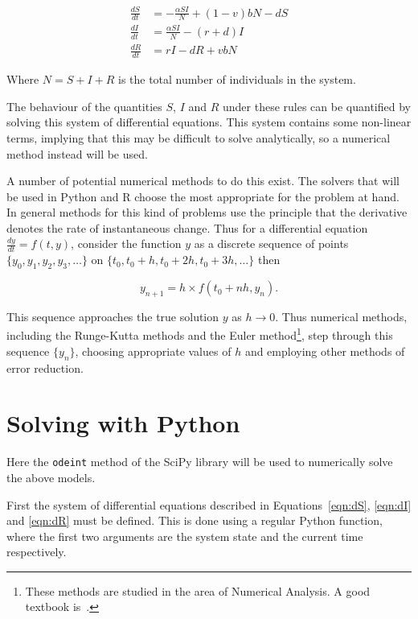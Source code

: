 \begin{align}
\frac{dS}{dt} &= -\frac{\alpha SI}{N} + (1 - v)bN - dS \label{eqn:dS}\\
\frac{dI}{dt} &= \frac{\alpha SI}{N} - (r + d)I \label{eqn:dI}\\
\frac{dR}{dt} &= rI - dR + vbN \label{eqn:dR}
\end{align}

Where $N = S + I + R$ is the total number of individuals in the system.

The behaviour of the quantities $S$, $I$ and $R$
under these rules can be quantified by solving this system of differential
equations. This system contains some non-linear terms, implying that this may be
difficult to solve analytically, so a numerical method instead will be used.

A number of potential numerical methods to do this exist.
The solvers that will be used in Python
and R choose the most appropriate for the problem at hand. In general
methods for this kind of problems use the principle that the derivative denotes
the rate of instantaneous change. Thus for a differential equation
$\frac{dy}{dt} = f(t,y)$, consider the function $y$ as a discrete sequence of
points $\{y_0, y_1, y_2, y_3, \dots\}$ on
$\{t_0, t_0 + h, t_0 + 2h, t_0 + 3h, \dots\}$ then

\begin{equation}
y_{n+1} = h \times f(t_0 + nh, y_n).
\end{equation}

This sequence approaches the true solution $y$ as $h \rightarrow 0$.
Thus numerical methods, including the Runge-Kutta methods and the Euler
method\footnote{
    These methods are studied in the area of Numerical Analysis. A good textbook
    is~\autocite{burden2001numerical}.
},
step through this sequence $\{y_n\}$, choosing appropriate values of $h$ and
employing other methods of error reduction.


\section{Solving with Python}\label{sec:solving-with-python}

Here the \texttt{odeint} method of the SciPy
library will be used to numerically solve the above models.

First the system of differential equations described in Equations~\ref{eqn:dS},
\ref{eqn:dI} and \ref{eqn:dR} must be defined. This is done using a regular
Python function, where the first two arguments are the system state and the
current time respectively.

